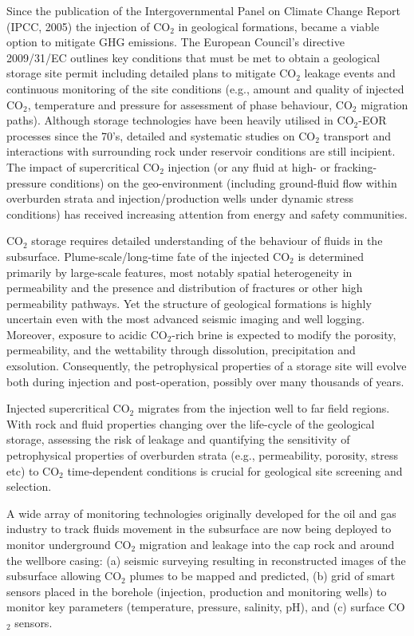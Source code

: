 \documentclass[12pts,a4paper,amsmath,amssymb,floatfix]{article}%
\newcommand{\CO}{CO\ensuremath{_{2}}}
\begin{document}
Since the publication of the Intergovernmental Panel on Climate Change Report (IPCC, 2005) the injection of \CO\; in geological formations, became a viable option to mitigate GHG emissions. The European Council's directive 2009/31/EC outlines key conditions that must be met to obtain a geological storage site permit including detailed plans to mitigate \CO\; leakage events and continuous monitoring of the site conditions (e.g., amount and quality of injected \CO, temperature and pressure for assessment of phase behaviour, \CO\; migration paths). Although storage technologies have been heavily utilised in \CO-EOR processes since the 70's, detailed and systematic studies on \CO\; transport and interactions with surrounding rock under reservoir conditions are still incipient. The impact of supercritical \CO\; injection (or any fluid at high- or fracking-pressure conditions) on the geo-environment (including ground-fluid flow within overburden strata and injection/production wells under dynamic stress conditions) has received increasing attention from energy and safety communities.

\CO\; storage requires detailed understanding of the behaviour of fluids in the subsurface.  Plume-scale/long-time fate of the injected \CO\; is determined primarily by large-scale features, most notably spatial heterogeneity in permeability and the presence and distribution of fractures or other high permeability pathways.  Yet the structure of geological formations is highly uncertain even with the most advanced seismic imaging and well logging.  Moreover, exposure to acidic \CO-rich brine is expected to modify the porosity, permeability, and the wettability through dissolution, precipitation and exsolution.  Consequently, the petrophysical properties of a storage site will evolve both during injection and post-operation, possibly over many thousands of years.  

Injected supercritical \CO\; migrates from the injection well to far field regions. With rock and fluid properties changing over the life-cycle of the geological storage, assessing the risk of leakage and quantifying the sensitivity of petrophysical properties of overburden strata (e.g., permeability, porosity, stress etc) to \CO\; time-dependent conditions is crucial for geological site screening and selection. 

A wide array of monitoring technologies originally developed for the oil and gas industry to track fluids movement in the subsurface are now being deployed to monitor underground \CO\; migration and leakage into the cap rock and around the wellbore casing: (a) seismic surveying resulting in reconstructed images of the subsurface allowing \CO\; plumes to be mapped and predicted, (b) grid of smart sensors placed in the borehole (injection, production and monitoring wells) to monitor key parameters (temperature, pressure, salinity, pH), and (c) surface \CO\; sensors.
 
\end{document}
